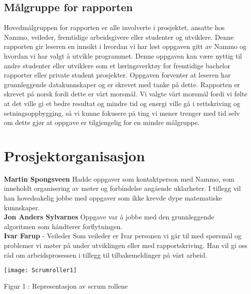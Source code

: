 \subsection{Målgruppe for rapporten}
Hovedmålgruppen for rapporten er alle involverte i prosjektet, ansatte hos Nammo, veileder, fremtidige arbeidsgivere eller studenter og utviklere. Denne rapporten gir leseren en innsikt i hvordan vi har løst oppgaven gitt av Nammo og hvordan vi har valgt å utvikle programmet. Denne oppgaven kan være nyttig til andre studenter eller utviklere som et læringsverktøy for fremtidige bachelor rapporter eller private student prosjekter. Oppgaven forventer at leseren har grunnleggende datakunnskaper og er skrevet med tanke på dette. Rapporten er skrevet på norsk fordi dette er vårt morsmål. Vi valgte vårt morsmål fordi vi følte at det ville gi et bedre resultat og mindre tid og energi ville gå i rettskriving og setningsoppbygging, så vi kunne fokusere på ting vi mener trenger med tid selv om dette gjør at oppgave er tilgjengelig for en mindre målgruppe.

\section{Prosjektorganisasjon}
 \textbf{Martin Spongsveen} Hadde oppgaver som kontaktperson med Nammo, som inneholdt 
organisering av møter og forbindelse angående uklarheter. I tillegg vil han hovedsakelig jobbe med oppgaver som ikke krevde dype matematiske kunnskaper.\\

 \textbf{Jon Anders Sylvarnes} Oppgave var å jobbe med den grunnleggende algoritmen som
håndterer forflytningen.\\

 \textbf{Ivar Farup} - Veileder Som veileder er Ivar personen vi går til med spørsmål og problemer vi 
møter på under utviklingen eller med rapportskriving. Han vil gi oss råd om arbeidsprosessen i tillegg til tilbakemeldinger på vårt arbeid.\\
\graphicspath{ {Pictures\Bachelor} }
\texttt{[image: Scrumroller1]}

Figur 1 : Representasjon av scrum rollene


